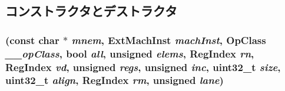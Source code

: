 \subsection{コンストラクタとデストラクタ}
\hypertarget{classArmISA_1_1VstSingleOp_af0f9e5c15c10a709383bd04133330235}{
\subsubsection[{VstSingleOp}]{ (const char $\ast$ {\em mnem}, \/  {\bf ExtMachInst} {\em machInst}, \/  OpClass {\em \_\-\_\-opClass}, \/  bool {\em all}, \/  unsigned {\em elems}, \/  {\bf RegIndex} {\em rn}, \/  {\bf RegIndex} {\em vd}, \/  unsigned {\em regs}, \/  unsigned {\em inc}, \/  {\bf uint32\_\-t} {\em size}, \/  {\bf uint32\_\-t} {\em align}, \/  {\bf RegIndex} {\em rm}, \/  unsigned {\em lane})}}
\label{classArmISA_1_1VstSingleOp_af0f9e5c15c10a709383bd04133330235}



